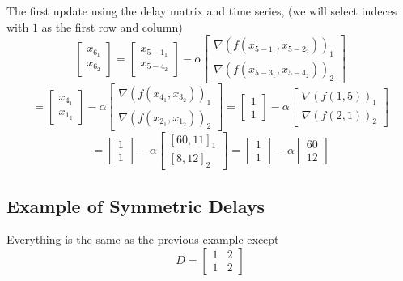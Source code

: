 \documentclass[10pt]{elsarticle}
\theoremstyle{remark}
\begin{document}
The first update using the delay matrix and time series, (we will select indeces with $1$ as the first row and column)
\[
\begin{bmatrix}
    x_{6_1}\\
    x_{6_2}
\end{bmatrix} = 
\begin{bmatrix}
    x_{{5-1}_{1}}\\
    x_{{5-4}_{2}}   
\end{bmatrix} - \alpha
\begin{bmatrix}
    \nabla(f(x_{{5-1}_{1}},x_{{5-2}_{2}}))_{1} \\
    \nabla(f(x_{{5-3}_{1}},x_{{5-4}_{2}}))_{2}
\end{bmatrix}
\]
\[
 = 
\begin{bmatrix}
   x_{{4}_{1}} \\
   x_{{1}_{2}}
\end{bmatrix} - \alpha
\begin{bmatrix}
    \nabla(f(x_{{4}_{1}},x_{{3}_{2}}))_{1} \\
    \nabla(f(x_{{2}_{1}},x_{{1}_{2}}))_{2}
\end{bmatrix} = 
\begin{bmatrix}
    1 \\
    1
\end{bmatrix} - \alpha
\begin{bmatrix}
    \nabla(f(1,5))_{1} \\
    \nabla(f(2,1))_{2}
\end{bmatrix}
\]
\[
 = 
\begin{bmatrix}
    1 \\
    1
\end{bmatrix} - \alpha
\begin{bmatrix}
    [60,11]_{1} \\ 
    [8, 12]_{2}
\end{bmatrix} = 
\begin{bmatrix}
    1 \\
    1
\end{bmatrix} - \alpha
\begin{bmatrix}
    60 \\
    12
\end{bmatrix}
\]
\subsection*{Example of Symmetric Delays}
Everything is the same as the previous example except 
\begin{equation}
D = \begin{bmatrix}
1&2 \\
1&2 
\end{bmatrix}
\end{equation}
\end{document}
